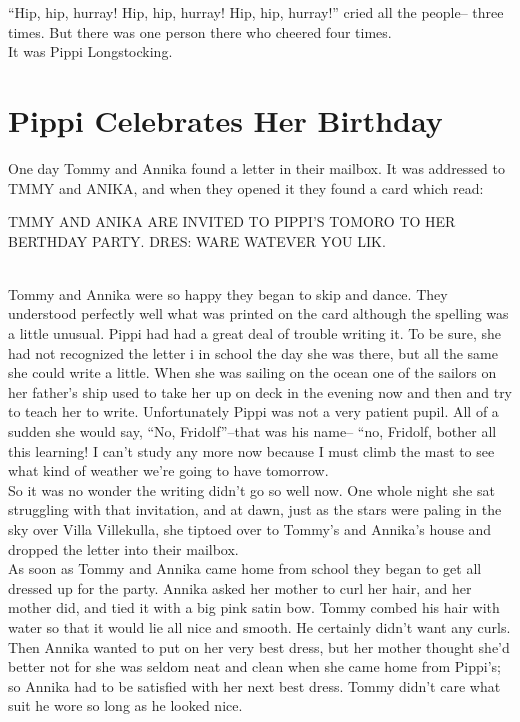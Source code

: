 \documentclass{standard}
\begin{document}
“Hip, hip, hurray! Hip, hip, hurray! Hip, hip, hurray!” cried all the people-- three times. But there was one person there who cheered four times.\\

It was Pippi Longstocking.
\newpage



\section{Pippi Celebrates Her Birthday}
One day Tommy and Annika found a letter in their mailbox.
It was addressed to TMMY and ANIKA, and when they opened it they found a card which read:\\

\begin{center}
TMMY AND ANIKA ARE INVITED TO PIPPI’S TOMORO TO HER BERTHDAY PARTY. DRES: WARE WATEVER YOU LIK.
\end{center}
\noindent\\

Tommy and Annika were so happy they began to skip and dance. They understood perfectly well what was printed on the card although the spelling was a little unusual. Pippi had had a great deal of trouble writing it. To be sure, she had not recognized the letter i in school the day she was there, but all the same she could write a little. When she was sailing on the ocean one of the sailors on her father’s ship used to take her up on deck in the evening now and then and try to teach her to write. Unfortunately Pippi was not a very patient pupil. All of a sudden she would say, “No, Fridolf”--that was his name-- “no, Fridolf, bother all this learning! I can’t study any more now because I must climb the mast to see what kind of weather we’re going to have tomorrow.\\

So it was no wonder the writing didn’t go so well now. One whole night she sat struggling with that invitation, and at dawn, just as the stars were paling in the sky over Villa Villekulla, she tiptoed over to Tommy’s and Annika’s house and dropped the letter into their mailbox.\\

As soon as Tommy and Annika came home from school they began to get all dressed up for the party. Annika asked her mother to curl her hair, and her mother did, and tied it with a big pink satin bow. Tommy combed his hair with water so that it would lie all nice and smooth. He certainly didn’t want any curls. Then Annika wanted to put on her very best dress, but her mother thought she’d better not for she was seldom neat and clean when she came home from Pippi’s; so Annika had to be satisfied with her next best dress. Tommy didn’t care what suit he wore so long as he looked nice.\\
\end{document}
